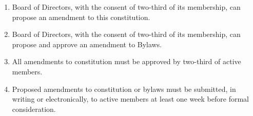 
\begin{enumerate}
	\item Board of Directors, with the consent of two-third of its membership, can propose an amendment to this constitution.
    \item Board of Directors, with the consent of two-third of its membership, can propose and approve an amendment to Bylaws.
    \item All amendments to constitution must be approved by two-third of active members.
    \item Proposed amendments to constitution or bylaws must be submitted, in writing or electronically, to active members at least one week before formal consideration.
\end{enumerate}
